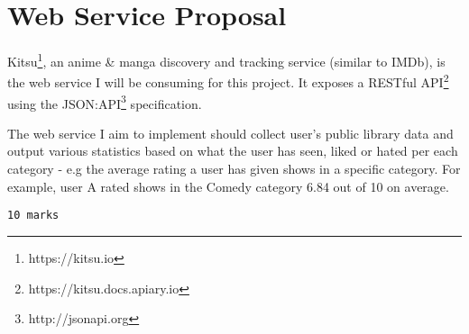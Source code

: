 \section{Web Service Proposal}

Kitsu\footnote{https://kitsu.io}, an anime \& manga discovery and tracking service (similar to IMDb), is the web service I will be consuming for this project. It exposes a RESTful API\footnote{https://kitsu.docs.apiary.io} using the JSON:API\footnote{http://jsonapi.org} specification.

The web service I aim to implement should collect user's public library data and output various statistics based on what the user has seen, liked or hated per each category - e.g the average rating a user has given shows in a specific category. For example, user A rated shows in the Comedy category 6.84 out of 10 on average.

\texttt{10 marks}
